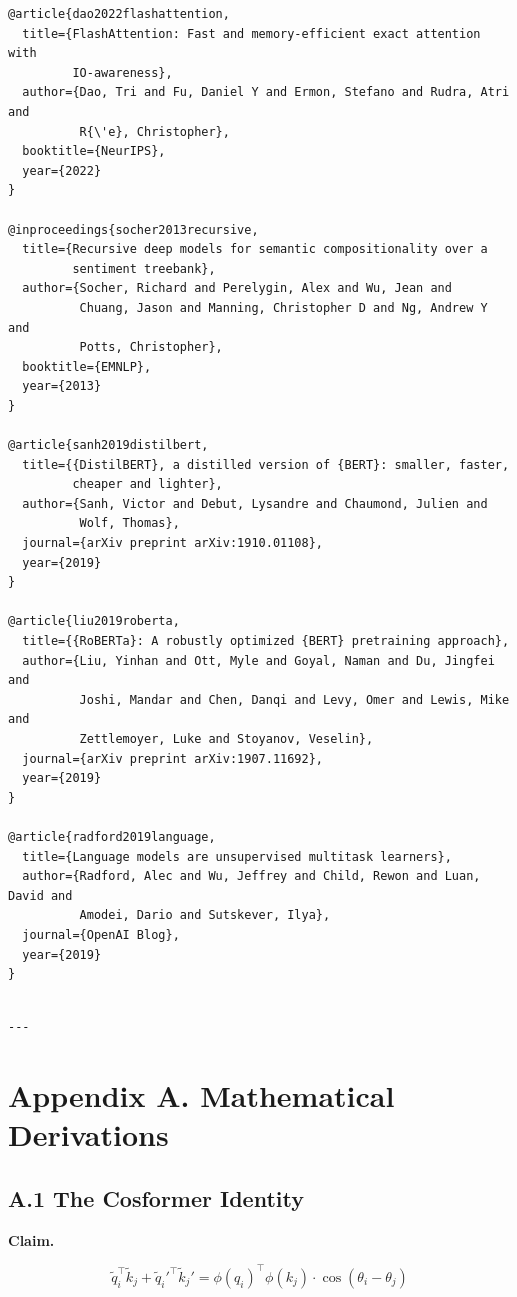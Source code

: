 \begin{lstlisting}
@article{dao2022flashattention,
  title={FlashAttention: Fast and memory-efficient exact attention with 
         IO-awareness},
  author={Dao, Tri and Fu, Daniel Y and Ermon, Stefano and Rudra, Atri and 
          R{\'e}, Christopher},
  booktitle={NeurIPS},
  year={2022}
}

@inproceedings{socher2013recursive,
  title={Recursive deep models for semantic compositionality over a 
         sentiment treebank},
  author={Socher, Richard and Perelygin, Alex and Wu, Jean and 
          Chuang, Jason and Manning, Christopher D and Ng, Andrew Y and 
          Potts, Christopher},
  booktitle={EMNLP},
  year={2013}
}

@article{sanh2019distilbert,
  title={{DistilBERT}, a distilled version of {BERT}: smaller, faster, 
         cheaper and lighter},
  author={Sanh, Victor and Debut, Lysandre and Chaumond, Julien and 
          Wolf, Thomas},
  journal={arXiv preprint arXiv:1910.01108},
  year={2019}
}

@article{liu2019roberta,
  title={{RoBERTa}: A robustly optimized {BERT} pretraining approach},
  author={Liu, Yinhan and Ott, Myle and Goyal, Naman and Du, Jingfei and 
          Joshi, Mandar and Chen, Danqi and Levy, Omer and Lewis, Mike and 
          Zettlemoyer, Luke and Stoyanov, Veselin},
  journal={arXiv preprint arXiv:1907.11692},
  year={2019}
}

@article{radford2019language,
  title={Language models are unsupervised multitask learners},
  author={Radford, Alec and Wu, Jeffrey and Child, Rewon and Luan, David and 
          Amodei, Dario and Sutskever, Ilya},
  journal={OpenAI Blog},
  year={2019}
}
\end{lstlisting}
\begin{lstlisting}

---
\end{lstlisting}


\section{Appendix A. Mathematical Derivations}

\subsection{A.1 The Cosformer Identity}

\textbf{Claim.}

\[
\tilde{q}_i^\top \tilde{k}_j + \tilde{q}_i'^\top \tilde{k}_j' = \phi(q_i)^\top \phi(k_j) \cdot \cos(\theta_i - \theta_j)
\]

